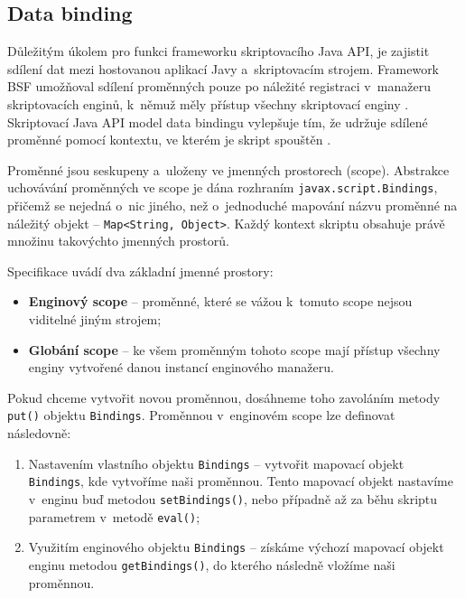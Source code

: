 \subsection{Data binding}
\label{Chapter.JavaScriptInJavaAnalysis.ScriptingJavaAPI.DataBinding}

Důležitým úkolem pro funkci frameworku skriptovacího Java API, je zajistit sdílení dat mezi hostovanou aplikací Javy a~skriptovacím strojem. Framework BSF umožňoval sdílení proměnných pouze po náležité registraci v~manažeru skriptovacích enginů, k~němuž měly přístup všechny skriptovací enginy \cite{Bibliography.JavaAPI.Script.Book}. Skriptovací Java API model data bindingu vylepšuje tím, že udržuje sdílené proměnné pomocí kontextu, ve kterém je skript spouštěn \cite{Bibliography.JavaAPI.Script.Book}.

Proměnné jsou seskupeny a~uloženy ve jmenných prostorech (scope). Abstrakce uchovávání proměnných ve scope je dána rozhraním \texttt{javax.script.Bindings}, přičemž se nejedná o~nic jiného, než o~jednoduché mapování názvu proměnné na náležitý objekt -- \texttt{Map<String, Object>}. Každý kontext skriptu obsahuje právě množinu takovýchto jmenných prostorů.

\bigskip \noindent Specifikace uvádí dva základní jmenné prostory:

\begin{itemize}
  \item \textbf{Enginový scope} -- proměnné, které se vážou k~tomuto scope nejsou viditelné jiným strojem;
  \item \textbf{Globání scope} -- ke všem proměnným tohoto scope  mají přístup všechny enginy vytvořené danou instancí enginového manažeru.
\end{itemize}

Pokud chceme vytvořit novou proměnnou, dosáhneme toho zavoláním metody \texttt{put()} objektu \texttt{Bindings}. Proměnnou v~enginovém scope  lze definovat následovně:

\begin{enumerate}
  \item Nastavením vlastního objektu \texttt{Bindings} -- vytvořit mapovací objekt \texttt{Bindings}, kde vytvoříme naši proměnnou. Tento mapovací objekt nastavíme v~enginu buď metodou \texttt{setBindings()}, nebo případně až za běhu skriptu parametrem v~metodě \texttt{eval()};
  \item Využitím enginového objektu \texttt{Bindings} -- získáme výchozí mapovací objekt enginu metodou \texttt{getBindings()}, do kterého následně vložíme naši proměnnou.
\end{enumerate}

